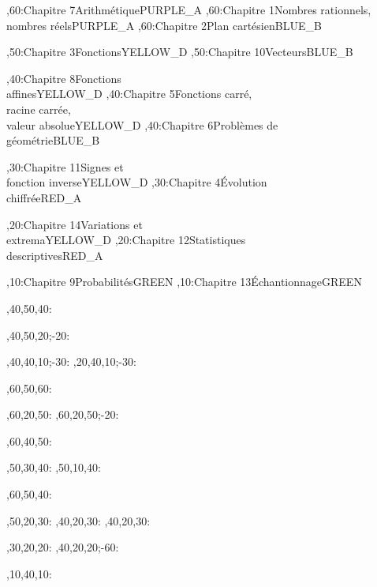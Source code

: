 \documentclass[tikz]{standalone}
\begin{document}
%
	\begin{chart}
	,60:{Chapitre 7}{Arithmétique}{}{PURPLE_A}
	,60:{Chapitre 1}{Nombres rationnels, \\ nombres réels}{}{PURPLE_A}
	,60:{Chapitre 2}{Plan cartésien}{}{BLUE_B}
	
	,50:{Chapitre 3}{Fonctions}{}{YELLOW_D}
	,50:{Chapitre 10}{Vecteurs}{}{BLUE_B}
	
	,40:{Chapitre 8}{Fonctions \\ affines}{}{YELLOW_D}
	,40:{Chapitre 5}{Fonctions carré, \\ racine carrée, \\ valeur absolue}{}{YELLOW_D}
	,40:{Chapitre 6}{Problèmes de \\ géométrie}{}{BLUE_B}
	
	,30:{Chapitre 11}{Signes et \\ fonction inverse}{}{YELLOW_D}
	,30:{Chapitre 4}{Évolution \\ chiffrée}{}{RED_A}
	
	,20:{Chapitre 14}{Variations et \\ extrema}{}{YELLOW_D}
	,20:{Chapitre 12}{Statistiques \\ descriptives}{}{RED_A}
	
	,10:{Chapitre 9}{Probabilités}{}{GREEN}
	,10:{Chapitre 13}{Échantionnage}{}{GREEN}
	
	
	
	
	,40,50,40:
	
	
	
	,40,50,20;-20:
	
	,40,40,10;-30:
	,20,40,10;-30:

	,60,50,60:
	
	,60,20,50:
	,60,20,50;-20:
	
	,60,40,50:
	
	,50,30,40:
	,50,10,40:
	
	,60,50,40:
	
	,50,20,30:
	,40,20,30:
	,40,20,30:
	
	,30,20,20:
	,40,20,20;-60:
	
	,10,40,10:
	
	\end{chart}
%
\end{document}
